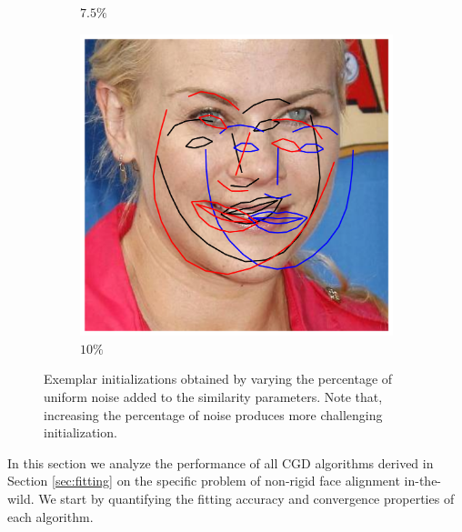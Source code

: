 \begin{figure}[t!]
\begin{subfigure}{0.16\textwidth}
		\caption{$7.5\%$}
		\label{fig:ini_3}
	\end{subfigure}
	\begin{subfigure}{0.16\textwidth}
		\includegraphics[width=\textwidth]{figures/ini_4.png}
		\caption{$10\%$}
		\label{fig:ini_4}
	\end{subfigure}
    \caption{Exemplar initializations obtained by varying the percentage of uniform noise added to the similarity parameters. Note that, increasing the percentage of noise produces more challenging initialization.}
    \label{fig:ini}
\end{figure}

In this section we analyze the performance of all CGD algorithms derived in Section \ref{sec:fitting} on the specific problem of non-rigid face alignment in-the-wild. We start by quantifying the fitting accuracy and convergence properties of each algorithm.

